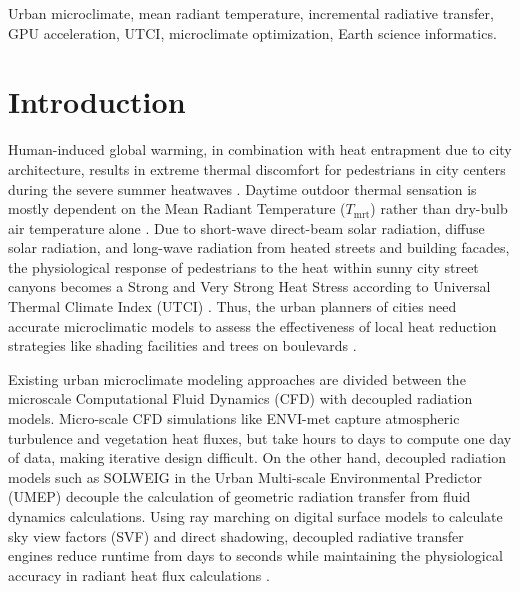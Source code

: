 \documentclass[conference]{IEEEtran}
\newcommand{\Tmrt}{T_{\mathrm{mrt}}}
\begin{document}
\begin{IEEEkeywords}
Urban microclimate, mean radiant temperature, incremental radiative transfer, GPU acceleration, UTCI, microclimate optimization, Earth science informatics.
\end{IEEEkeywords}

\section{Introduction}

Human-induced global warming, in combination with heat entrapment due to city architecture, results in extreme thermal discomfort for pedestrians in city centers during the severe summer heatwaves \cite{oke1982canyon,grimmond2010climate}. Daytime outdoor thermal sensation is mostly dependent on the Mean Radiant Temperature ($\Tmrt$) rather than dry-bulb air temperature alone \cite{matzarakis2007modelling}. Due to short-wave direct-beam solar radiation, diffuse solar radiation, and long-wave radiation from heated streets and building facades, the physiological response of pedestrians to the heat within sunny city street canyons becomes a Strong and Very Strong Heat Stress according to Universal Thermal Climate Index (UTCI) \cite{jendritzky2012universal,blazejczyk2013introduction}. Thus, the urban planners of cities need accurate microclimatic models to assess the effectiveness of local heat reduction strategies like shading facilities and trees on boulevards \cite{krayenhoff2021cooling}.

Existing urban microclimate modeling approaches are divided between the microscale Computational Fluid Dynamics (CFD) with decoupled radiation models. Micro-scale CFD simulations like ENVI-met \cite{bruse1998simulating} capture atmospheric turbulence and vegetation heat fluxes, but take hours to days to compute one day of data, making iterative design difficult. On the other hand, decoupled radiation models such as SOLWEIG in the Urban Multi-scale Environmental Predictor (UMEP) \cite{lindberg2008solweig,lindberg2018urban} decouple the calculation of geometric radiation transfer from fluid dynamics calculations. Using ray marching on digital surface models to calculate sky view factors (SVF) and direct shadowing, decoupled radiative transfer engines reduce runtime from days to seconds while maintaining the physiological accuracy in radiant heat flux calculations \cite{gal2009sky,do2024geospatial}.
\end{document}
